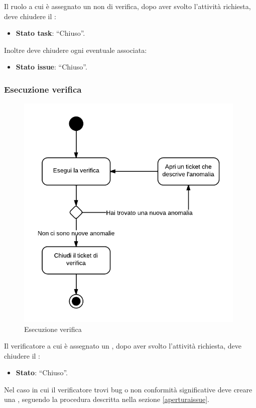 Il ruolo a cui è assegnato un  non di verifica, dopo aver svolto l'attività richiesta, deve chiudere il :
\begin{itemize}
 \item \textbf{Stato task}: ``Chiuso''.
\end{itemize}

Inoltre deve chiudere ogni eventuale  associata:
\begin{itemize}
 \item \textbf{Stato issue}: ``Chiuso''.
\end{itemize}

\subsubsection{Esecuzione verifica}

\begin{figure}[H]
    \centering
    \includegraphics[width=11cm]{uml-processi/esecuzione_verifica.png}
    \caption{Esecuzione verifica}
\end{figure}

Il verificatore a cui è assegnato un , dopo aver svolto l'attività richiesta, deve chiudere il :
\begin{itemize}
 \item \textbf{Stato}: ``Chiuso''.
\end{itemize}

Nel caso in cui il verificatore trovi bug o non conformità significative deve creare una , seguendo la procedura descritta nella sezione \ref{aperturaissue}.


